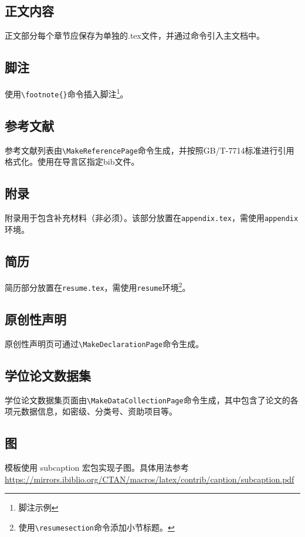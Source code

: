 \subsection{正文内容}
正文部分每个章节应保存为单独的.tex文件，并通过\verb||命令引入主文档中。

\subsection{脚注}
使用\verb|\footnote{}|命令插入脚注\footnote{脚注示例}。

\subsection{参考文献}
参考文献列表由\verb|\MakeReferencePage|命令生成，并按照GB/T-7714标准进行引用格式化。使用\verb||在导言区指定bib文件。

\subsection{附录}
附录用于包含补充材料（非必须）。该部分放置在\texttt{appendix.tex}，需使用\texttt{appendix}环境。

\subsection{简历}
简历部分放置在\texttt{resume.tex}，需使用\texttt{resume}环境\footnote{使用\texttt{\textbackslash resumesection{}}命令添加小节标题。}。

\subsection{原创性声明}
原创性声明页可通过\verb|\MakeDeclarationPage|命令生成。

\subsection{学位论文数据集}
学位论文数据集页面由\verb|\MakeDataCollectionPage|命令生成，其中包含了论文的各项元数据信息，如密级、分类号、资助项目等。

\subsection{图}
模板使用 \textsf{subcaption} 宏包实现子图。具体用法参考\url{https://mirrors.ibiblio.org/CTAN/macros/latex/contrib/caption/subcaption.pdf}

